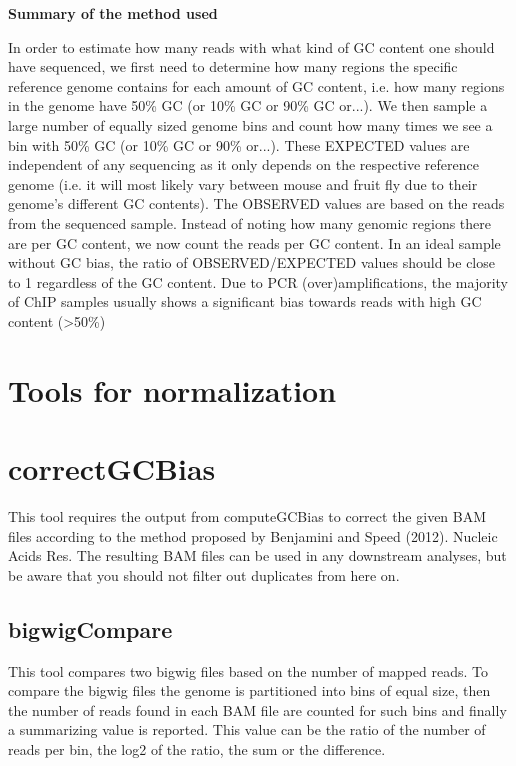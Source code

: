 \documentclass[11pt,a4paper]{article}
\begin{document}
\textbf{Summary of the method used}

In order to estimate how many reads with what kind of GC content one
should have sequenced, we first need to determine how many regions the
specific reference genome contains for each amount of GC content,
i.e. how many regions in the genome have 50\% GC (or 10\% GC or 90\%
GC or...).  We then sample a large number of equally sized genome bins
and count how many times we see a bin with 50\% GC (or 10\% GC or 90\%
or...). These EXPECTED values are independent of any  sequencing as it
only depends on the respective reference genome (i.e. it will most
likely vary between mouse and fruit fly due to their genome's
different GC contents).  The OBSERVED values are based on the reads
from the sequenced sample. Instead of noting how many genomic regions
there are per GC content, we now count the reads per GC content.  In
an ideal sample without GC bias, the ratio of OBSERVED/EXPECTED values
should be close to 1 regardless of the GC content. Due to PCR
(over)amplifications, the majority of ChIP samples usually shows a
significant bias towards reads with high GC content (>50\%)


\section{Tools for normalization}

\section{correctGCBias}

This tool requires the output from computeGCBias to correct the given
BAM files according to the method proposed by Benjamini and Speed
(2012). Nucleic Acids Res.  The resulting BAM files can be used in any
downstream analyses, but be aware that you should not filter out
duplicates from here on.


\subsection{bigwigCompare}

This tool compares two bigwig files based on the number of mapped reads. To
compare the bigwig files the genome is partitioned into bins of equal size,
then the number of reads found in each BAM file are counted for such bins and
finally a summarizing value is reported. This value can be the ratio of the
number of reads per bin, the log2 of the ratio, the sum or the difference.
\end{document}
